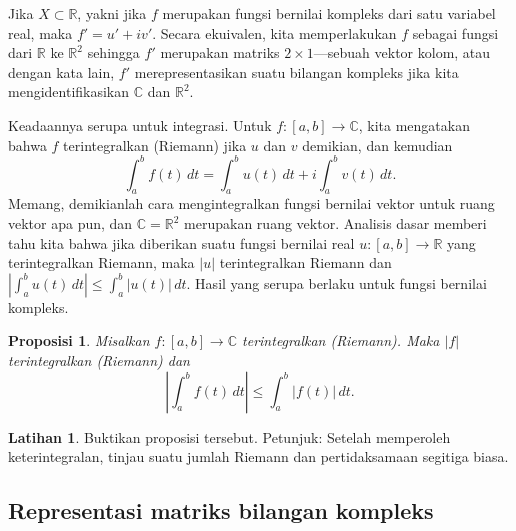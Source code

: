 \documentclass[12pt,openany]{book}
\newcommand{\sabs}[1]{\lvert {#1} \rvert}
\newcommand{\abs}[1]{\left\lvert {#1} \right\rvert}
\newcommand{\C}{{\mathbb{C}}}
\newcommand{\R}{{\mathbb{R}}}
\theoremstyle{plain}
\newtheorem{prop}[thm]{Proposisi}
\theoremstyle{remark}
\theoremstyle{definition}
\newenvironment{exbox}{%
    \def\FrameCommand{\vrule width 1pt \relax\hspace{10pt}}%
    \MakeFramed{\advance\hsize-\width\FrameRestore}%
}{%
    \endMakeFramed
}
\theoremstyle{exercise}
\newtheorem{exercise}{Latihan}[section]
\theoremstyle{example}
\begin{document}
Jika $X \subset \R$, yakni jika $f$ merupakan fungsi bernilai kompleks
dari satu variabel real, maka $f' = u' + iv'$.
Secara ekuivalen, kita memperlakukan $f$ sebagai fungsi dari $\R$ ke $\R^2$
sehingga $f'$ merupakan matriks $2 \times 1$---sebuah vektor kolom, atau dengan kata lain,
$f'$ merepresentasikan suatu bilangan kompleks jika kita mengidentifikasikan $\C$ dan $\R^2$.

Keadaannya serupa untuk integrasi.
Untuk $f \colon [a,b] \to \C$,
kita mengatakan bahwa $f$ terintegralkan (Riemann) jika $u$ dan $v$ demikian, dan kemudian
\begin{equation*}
\int_a^b f(t) \, dt = 
\int_a^b u(t) \, dt + i \int_a^b v(t) \, dt .
\end{equation*}
Memang, demikianlah cara mengintegralkan fungsi bernilai vektor
untuk ruang vektor apa pun, dan $\C = \R^2$ merupakan ruang vektor.
Analisis dasar memberi tahu kita bahwa
jika diberikan suatu fungsi bernilai real
$u \colon [a,b] \to \R$ yang terintegralkan Riemann,
maka $\abs{u}$ terintegralkan
Riemann dan $\abs{\int_a^b u(t) \, dt} \leq \int_a^b \sabs{u(t)} \, dt$.
Hasil yang serupa berlaku untuk fungsi bernilai kompleks.

\begin{prop} \label{prop:inttriangleineq}
Misalkan $f \colon [a,b] \to \C$ terintegralkan (Riemann).  Maka $\sabs{f}$
terintegralkan (Riemann) dan
\begin{equation*}
\abs{\int_a^b f(t) \, dt} \leq 
\int_a^b \abs{f(t)} \, dt .
\end{equation*}
\end{prop}

\begin{exbox}
\begin{exercise}%
Buktikan proposisi tersebut.  Petunjuk: Setelah memperoleh keterintegralan, tinjau
suatu jumlah Riemann dan pertidaksamaan segitiga biasa.
\end{exercise}
\end{exbox}

\subsection{Representasi matriks bilangan kompleks}
\end{document}
